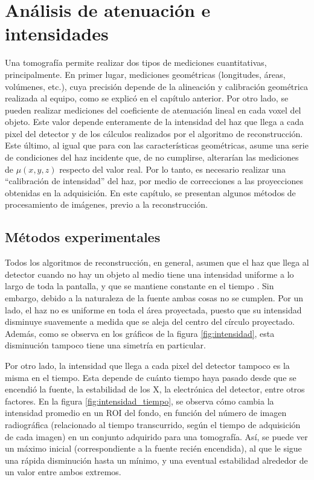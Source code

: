 \chapter{Análisis de atenuación e intensidades}
\label{cap:cal_intensidad}

Una tomografía permite realizar dos tipos de mediciones cuantitativas, principalmente. 
En primer lugar, mediciones geométricas (longitudes, áreas, volúmenes, etc.), cuya precisión
depende de la alineación y calibración geométrica realizada al equipo, como se explicó en
el capítulo anterior. Por otro lado, se pueden realizar mediciones del coeficiente de
atenuación lineal en cada voxel del objeto. Este valor depende enteramente de la
intensidad del haz que llega a cada pixel del detector y de los cálculos realizados por el
algoritmo de reconstrucción. Este último, al igual que para con las características geométricas,
asume una serie de condiciones del haz incidente que, de no cumplirse, alterarían las mediciones
de $\mu(x,y,z)$ respecto del valor real. Por lo tanto, es necesario realizar una ``calibración de
intensidad'' del haz, por medio de correcciones a las proyecciones obtenidas en la adquisición.
En este capítulo, se presentan algunos métodos de procesamiento de imágenes, previo a la
reconstrucción.

\section{Métodos experimentales}

Todos los algoritmos de reconstrucción, en general, asumen que el haz que llega al detector
cuando no hay un objeto al medio tiene una intensidad uniforme a lo largo de toda la pantalla, y
que se mantiene constante en el tiempo \cite{Als-Nielsen2011}. Sin embargo, debido a la naturaleza de la fuente ambas
cosas no se cumplen. Por un lado, el haz no es uniforme en toda el área proyectada, puesto que
su intensidad disminuye suavemente a medida que se aleja del centro del círculo proyectado. Además,
como se observa en los gráficos de la figura \ref{fig:intensidad}, esta disminución tampoco tiene
una simetría en particular. 

Por otro lado, la intensidad que llega a cada pixel del detector tampoco es la misma en el tiempo.
Esta depende de cuánto tiempo haya pasado desde que se encendió la fuente, la estabilidad de los
X, la electrónica del detector, entre otros factores. En la figura
\ref{fig:intensidad_tiempo}, se observa cómo cambia la intensidad promedio en un ROI del fondo,
en función del número de imagen radiográfica (relacionado al tiempo transcurrido, según el tiempo
de adquisición de cada imagen) en un conjunto adquirido para una tomografía. Así, se
puede ver un máximo inicial (correspondiente a la fuente recién encendida), al que le sigue una
rápida disminución hasta un mínimo, y una eventual estabilidad alrededor de un valor entre ambos
extremos.

